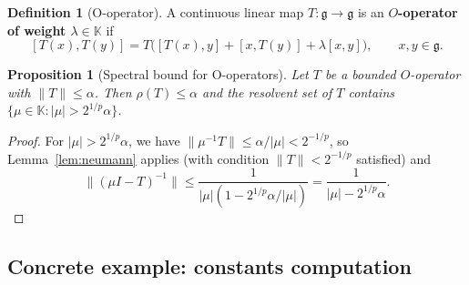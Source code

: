 \documentclass[10pt]{amsart}
\newtheorem{proposition}[theorem]{Proposition}
\theoremstyle{definition}
\newtheorem{definition}[theorem]{Definition}
\theoremstyle{remark}
\numberwithin{equation}{section}
\newcommand{\field}{\mathbb{K}} %
\begin{document}
\begin{definition}[O-operator]
A continuous linear map $T:\mathfrak{g}\to\mathfrak{g}$ is an \textbf{$O$-operator of
weight $\lambda\in\field$} if
\[
  [T(x),T(y)] = T\bigl([T(x),y] + [x,T(y)] + \lambda[x,y]\bigr),
  \qquad x,y\in\mathfrak{g}.
\]
\end{definition}

\begin{proposition}[Spectral bound for O-operators]
Let $T$ be a bounded $O$-operator with $\|T\|\le \alpha$.  Then $\rho(T) \le \alpha$
and the resolvent set of $T$ contains $\{\mu\in\field : |\mu| > 2^{1/p}\alpha\}$.
\end{proposition}

\begin{proof}
For $|\mu| > 2^{1/p}\alpha$, we have $\|\mu^{-1}T\| \le \alpha/|\mu| < 2^{-1/p}$, so
Lemma~\ref{lem:neumann} applies (with condition $\|T\| < 2^{-1/p}$ satisfied) and
\[
  \|(\mu I - T)^{-1}\| \le \frac{1}{|\mu|(1 - 2^{1/p}\alpha/|\mu|)}
  = \frac{1}{|\mu| - 2^{1/p}\alpha}.
\]
\end{proof}

\subsection{Concrete example: constants computation}
\end{document}
